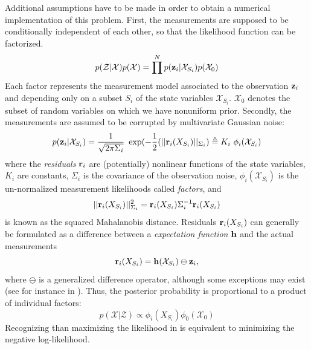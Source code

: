 Additional assumptions have to be made in order to obtain a numerical implementation of this problem.
First, the measurements are supposed to be conditionally independent of each other, so that the likelihood function can be factorized. 
%
\begin{equation}
    p(\mathcal{Z} | \mathcal{X}) p(\mathcal{X}) = \prod^{N} p({\bf z}_i | \mathcal{X}_{S_i}) p(\mathcal{X}_0)
\end{equation}
%
Each factor represents the measurement model associated to the  observation ${\bf z}_i$ and depending only on a subset $S_i$ of the state variables $\mathcal{X}_{S_i}$. 
$\mathcal{X}_0$ denotes the subset of random variables on which we have nonuniform prior.
Secondly, the measurements are assumed to be corrupted by multivariate Gaussian noise:
%
\begin{equation}
    p({\bf z}_i | \mathcal{X}_{S_i}) = \frac{1}{\sqrt{2\pi\Sigma_i}} ~ \exp(- \frac{1}{2} (||{\bf r}_i(X_{S_i})||_{\Sigma_i}) \triangleq K_i~\phi_i(\mathcal{X}_{S_i})
\end{equation}
%
where the \textit{residuals} ${\bf r}_i$ are (potentially) nonlinear functions of the state variables, $K_i$ are constants, $\Sigma_i$ is the covariance of the observation noise,
$\phi_i(\mathcal{X}_{S_i})$ is the un-normalized measurement likelihoods called \textit{factors},
and 
%
\begin{equation*}
    ||{\bf r}_i(X_{S_i})||^2_{\Sigma_i} = {\bf r}_i(X_{S_i}) \Sigma_i^{-1} {\bf r}_i(X_{S_i})    
\end{equation*}
%
is known as the squared Mahalanobis distance. 
Residuals ${\bf r}_i(X_{S_i})$ can generally be formulated as a difference between a \textit{expectation function} ${\bf h}$ and the actual measurements
%
\begin{equation}
    {\bf r}_i(X_{S_i}) = {\bf h}(\mathcal{X}_{S_i}) \ominus {\bf z}_i,
\end{equation}
%
where $\ominus$ is a generalized difference operator,
although some exceptions may exist (see for instance  in ).
%
Thus, the posterior probability is proportional to a product of individual factors:
%
\begin{equation}
    p(\mathcal{X} | \mathcal{Z}) \propto \phi_i(X_{S_i}) \phi_0(\mathcal{X}_{0})
    \label{eq:likelihood_factorization}
\end{equation}
%
Recognizing than maximizing the likelihood in  is equivalent to minimizing the negative log-likelihood.
%
